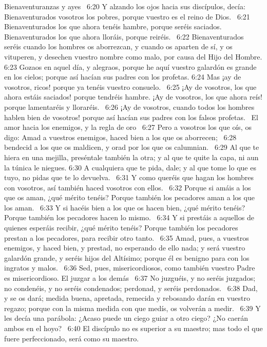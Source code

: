 Bienaventuranzas y ayes   
6:20 Y alzando los ojos hacia sus discípulos, decía: Bienaventurados vosotros los pobres, porque vuestro es el reino de Dios.  
6:21 Bienaventurados los que ahora tenéis hambre, porque seréis saciados. Bienaventurados los que ahora lloráis, porque reiréis.  
6:22 Bienaventurados seréis cuando los hombres os aborrezcan, y cuando os aparten de sí, y os vituperen, y desechen vuestro nombre como malo, por causa del Hijo del Hombre. 
6:23 Gozaos en aquel día, y alegraos, porque he aquí vuestro galardón es grande en los cielos; porque así hacían sus padres con los profetas. 
6:24 Mas ¡ay de vosotros, ricos! porque ya tenéis vuestro consuelo.  
6:25 ¡Ay de vosotros, los que ahora estáis saciados! porque tendréis hambre. ¡Ay de vosotros, los que ahora reís! porque lamentaréis y lloraréis.  
6:26 ¡Ay de vosotros, cuando todos los hombres hablen bien de vosotros! porque así hacían sus padres con los falsos profetas.  
El amor hacia los enemigos, y la regla de oro   
6:27 Pero a vosotros los que oís, os digo: Amad a vuestros enemigos, haced bien a los que os aborrecen;  
6:28 bendecid a los que os maldicen, y orad por los que os calumnian.  
6:29 Al que te hiera en una mejilla, preséntale también la otra; y al que te quite la capa, ni aun la túnica le niegues. 
6:30 A cualquiera que te pida, dale; y al que tome lo que es tuyo, no pidas que te lo devuelva.  
6:31 Y como queréis que hagan los hombres con vosotros, así también haced vosotros con ellos.  
6:32 Porque si amáis a los que os aman, ¿qué mérito tenéis? Porque también los pecadores aman a los que los aman.  
6:33 Y si hacéis bien a los que os hacen bien, ¿qué mérito tenéis? Porque también los pecadores hacen lo mismo.  
6:34 Y si prestáis a aquellos de quienes esperáis recibir, ¿qué mérito tenéis? Porque también los pecadores prestan a los pecadores, para recibir otro tanto.  
6:35 Amad, pues, a vuestros enemigos, y haced bien, y prestad, no esperando de ello nada; y será vuestro galardón grande, y seréis hijos del Altísimo; porque él es benigno para con los ingratos y malos.  
6:36 Sed, pues, misericordiosos, como también vuestro Padre es misericordioso. 
El juzgar a los demás   
6:37 No juzguéis, y no seréis juzgados; no condenéis, y no seréis condenados; perdonad, y seréis perdonados.  
6:38 Dad, y se os dará; medida buena, apretada, remecida y rebosando darán en vuestro regazo; porque con la misma medida con que medís, os volverán a medir.  
6:39 Y les decía una parábola: ¿Acaso puede un ciego guiar a otro ciego? ¿No caerán ambos en el hoyo?  
6:40 El discípulo no es superior a su maestro; mas todo el que fuere perfeccionado, será como su maestro.  
